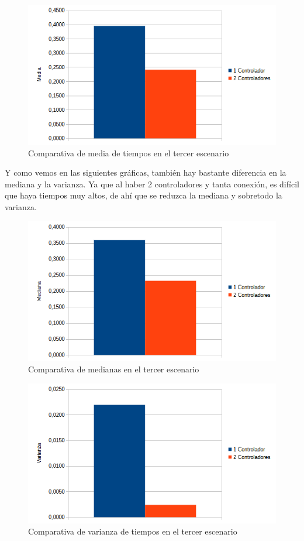 \documentclass[a4paper, 12pt]{book}
\begin{document}
 	
 	
 	\begin{figure}[H]
 		\centering
 		\includegraphics[width=12cm, keepaspectratio]{img/comparativamediaescenario3}
 		\caption{Comparativa de media de tiempos en el tercer escenario}
 		\label{figura:mediab4}
 	\end{figure}
 	
 	Y como vemos en las siguientes gráficas, también hay bastante diferencia en la mediana y la varianza. Ya que al haber 2 controladores y tanta conexión, es difícil que haya tiempos muy altos, de ahí que se reduzca la mediana y sobretodo la varianza.
 	
 	
 	\begin{figure}[H]
 		\centering
 		\includegraphics[width=12cm, keepaspectratio]{img/comparativamedianaescenario3}
 		\caption{Comparativa de medianas en el tercer escenario}
 		\label{figura:medianab4}
 	\end{figure}
 	
 	\begin{figure}[H]
 		\centering
 		\includegraphics[width=12cm, keepaspectratio]{img/comparativavarianzaescenario3}
 		\caption{Comparativa de varianza de tiempos en el tercer escenario}
 		\label{figura:varianzab4}
 	\end{figure}
 	
\end{document}
